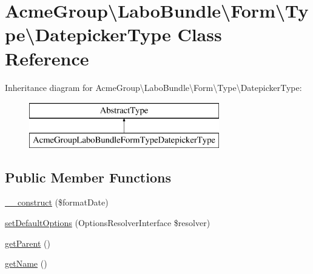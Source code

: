 \hypertarget{class_acme_group_1_1_labo_bundle_1_1_form_1_1_type_1_1_datepicker_type}{\section{Acme\+Group\textbackslash{}Labo\+Bundle\textbackslash{}Form\textbackslash{}Type\textbackslash{}Datepicker\+Type Class Reference}
\label{class_acme_group_1_1_labo_bundle_1_1_form_1_1_type_1_1_datepicker_type}
}
Inheritance diagram for Acme\+Group\textbackslash{}Labo\+Bundle\textbackslash{}Form\textbackslash{}Type\textbackslash{}Datepicker\+Type\+:\begin{figure}[H]
\begin{center}
\leavevmode
\includegraphics[height=2.000000cm]{class_acme_group_1_1_labo_bundle_1_1_form_1_1_type_1_1_datepicker_type}
\end{center}
\end{figure}
\subsection*{Public Member Functions}
\begin{DoxyCompactItemize}
\item 
\hyperlink{class_acme_group_1_1_labo_bundle_1_1_form_1_1_type_1_1_datepicker_type_adcea43095564dc827eeca30d29a8dc68}{\+\_\+\+\_\+construct} (\$format\+Date)
\item 
\hyperlink{class_acme_group_1_1_labo_bundle_1_1_form_1_1_type_1_1_datepicker_type_aaec3d55987532b02126adab70dddd37e}{set\+Default\+Options} (Options\+Resolver\+Interface \$resolver)
\item 
\hyperlink{class_acme_group_1_1_labo_bundle_1_1_form_1_1_type_1_1_datepicker_type_a5aa3237f7e2ae7fe17f67684fd67a1fb}{get\+Parent} ()
\item 
\hyperlink{class_acme_group_1_1_labo_bundle_1_1_form_1_1_type_1_1_datepicker_type_aba4599e26959ef85d017efdca3f1eed8}{get\+Name} ()
\end{DoxyCompactItemize}


